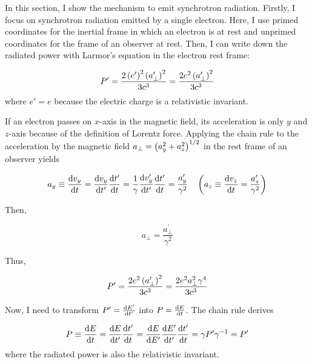 In this section, I show the mechanism to emit synchrotron radiation.
Firstly, I focus on synchrotron radiation emitted by a single electron.
Here, I use primed coordinates for the inertial frame in which an electron is at rest and unprimed coordinates for the frame of an observer at rest.
Then, I can write down the radiated power with Larmor's equation in the electron rest frame:

\begin{equation}\label{eq:essential_radio5n24}
    P^{\prime}=\frac{2\left(e^{\prime}\right)^{2}\left(a_{\perp}^{\prime}\right)^{2}}{3 c^{3}}=\frac{2 e^{2}\left(a_{\perp}^{\prime}\right)^{2}}{3 c^{3}}
\end{equation}
where $e'=e$ because the electric charge is a relativistic invariant.

If an electron passes on $x$-axis in the magnetic field, its acceleration is only $y$ and $z$-axis because of the definition of Lorentz force.
Applying the chain rule to the acceleration by the magnetic field $a_{\perp} = \left(a^2_y + a^2_z\right)^{1/2}$ in the rest frame of an observer yields

\begin{equation}\label{eq:essential_radio5n25}
    a_y \equiv \frac{\mathrm{d} v_y}{\mathrm{d} t}=\frac{\mathrm{d} v_y}{\mathrm{d} t^{\prime}} \frac{\mathrm{d} t^{\prime}}{\mathrm{d} t}=\frac{1}{\gamma} \frac{\mathrm{d} v_y^{\prime}}{\mathrm{d} t^{\prime}} \frac{\mathrm{d} t^{\prime}}{\mathrm{d} t}=\frac{a_y^{\prime}}{\gamma^2}\ \ \ \left(a_z \equiv \frac{\mathrm{d} v_z}{\mathrm{d} t} = \frac{a'_z}{\gamma^2}\right)
\end{equation}

Then,

\begin{equation}\label{eq:essential_radio5n26}
    a_{\perp}=\frac{a_{\perp}^{\prime}}{\gamma^{2}}
\end{equation}

Thus,

\begin{equation}\label{eq:essential_radio5n27}
    P^{\prime}=\frac{2 e^{2}\left(a_{\perp}^{\prime}\right)^{2}}{3 c^{3}}=\frac{2 e^{2} a_{\perp}^{2} \gamma^{4}}{3 c^{3}}
\end{equation}

Now, I need to transform $P' = \frac{\mathrm{d} E'}{\mathrm{d} t'}$ into $P = \frac{\mathrm{d} E}{\mathrm{d} t}$.
The chain rule derives

\begin{equation}\label{eq:essential_radio5n28}
    P \equiv \frac{\mathrm{d} E}{\mathrm{d} t}=\frac{\mathrm{d} E}{\mathrm{d} t^{\prime}} \frac{\mathrm{d} t^{\prime}}{\mathrm{d} t}=\frac{\mathrm{d} E}{\mathrm{d} E^{\prime}} \frac{\mathrm{d} E^{\prime}}{\mathrm{d} t^{\prime}} \frac{\mathrm{d} t^{\prime}}{\mathrm{d} t}=\gamma P^{\prime} \gamma^{-1}=P^{\prime}
\end{equation}
where the radiated power is also the relativistic invariant.

